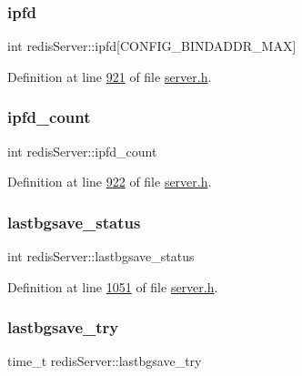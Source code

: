 \subsubsection{\texorpdfstring{ipfd}{ipfd}}
{\footnotesize\ttfamily int redis\+Server\+::ipfd\mbox{[}C\+O\+N\+F\+I\+G\+\_\+\+B\+I\+N\+D\+A\+D\+D\+R\+\_\+\+M\+AX\mbox{]}}



Definition at line \hyperlink{server_8h_source_l00921}{921} of file \hyperlink{server_8h_source}{server.\+h}.

\mbox{\label{structredisServer_afc847581c4350ddceb4fb65642e14ee6}} 
\subsubsection{\texorpdfstring{ipfd\+\_\+count}{ipfd\_count}}
{\footnotesize\ttfamily int redis\+Server\+::ipfd\+\_\+count}



Definition at line \hyperlink{server_8h_source_l00922}{922} of file \hyperlink{server_8h_source}{server.\+h}.

\mbox{\label{structredisServer_a35f5e0fbbdebcfa88a0789b392574a6d}} 
\subsubsection{\texorpdfstring{lastbgsave\+\_\+status}{lastbgsave\_status}}
{\footnotesize\ttfamily int redis\+Server\+::lastbgsave\+\_\+status}



Definition at line \hyperlink{server_8h_source_l01051}{1051} of file \hyperlink{server_8h_source}{server.\+h}.

\mbox{\label{structredisServer_a5f0a19f59dd1c0d15184d306166f452b}} 
\subsubsection{\texorpdfstring{lastbgsave\+\_\+try}{lastbgsave\_try}}
{\footnotesize\ttfamily time\+\_\+t redis\+Server\+::lastbgsave\+\_\+try}



